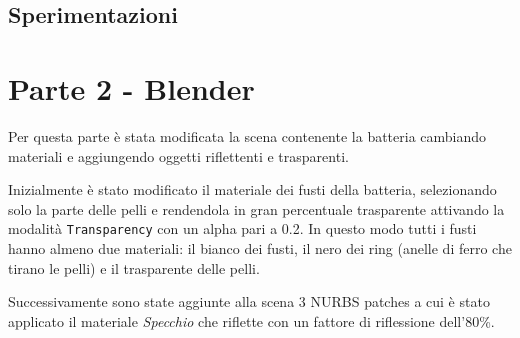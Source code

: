 \begin{figure}[hbt]
    \centering
    \vspace{-0.2cm}
	\vspace{-0.7cm}
\end{figure}

\subsection{Sperimentazioni}
\begin{figure}[hbt]
    \centering
    \vspace{-0.5cm}
	\vspace{-0.5cm}
\end{figure}



\newpage
\section{Parte 2 - Blender}
Per questa parte è stata modificata la scena contenente la batteria cambiando materiali e aggiungendo oggetti riflettenti e trasparenti.

Inizialmente è stato modificato il materiale dei fusti della batteria, selezionando solo la parte delle pelli e rendendola in gran percentuale trasparente attivando la modalità \texttt{Transparency} con un alpha pari a 0.2. In questo modo tutti i fusti hanno almeno due materiali: il bianco dei fusti, il nero dei ring (anelle di ferro che tirano le pelli) e il trasparente delle pelli.

Successivamente sono state aggiunte alla scena 3 NURBS patches a cui è stato applicato il materiale \textit{Specchio} che riflette con un fattore di riflessione dell'80\%. 
\begin{figure}[hbt]
    \centering
    \vspace{-0.5cm}
	\vspace{-0.5cm}
\end{figure}


